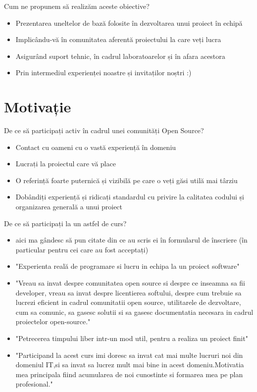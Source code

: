 \documentclass{beamer}
\begin{document}
\begin{frame}{Cum ne propunem să realizăm aceste obiective?}
  \begin{itemize} %
  \pause
  \item Prezentarea uneltelor de bază folosite în dezvoltarea unui proiect în echipă
  \pause
  \item Implicându-vă în comunitatea aferentă proiectului la care veți lucra 
  \pause
  \item Asigurând suport tehnic, în cadrul laboratoarelor și în afara acestora
  \pause
  \item Prin intermediul experienței noastre și invitaților noștri :)
  \end{itemize}
\end{frame}

\section{Motivație}

\begin{frame}{De ce să participați activ în cadrul unei comunități Open Source?}
  \begin{itemize} %
  \pause
  \item Contact cu oameni cu o vastă experiență în domeniu 
  \pause
  \item Lucrați la proiectul care vă place 
  \pause
  \item O referință foarte puternică și vizibilă pe care o veți găsi utilă mai târziu
  \pause
  \item Dobândiți experiență și ridicați standardul cu privire la calitatea codului și organizarea generală a unui proiect
  \end{itemize}
\end{frame}

\begin{frame}{De ce să participați la un astfel de curs?}
  \begin{itemize} %
  \item aici ma gândesc să pun citate din ce au scris ei în formularul de înscriere (în particular pentru cei care au fost acceptați) 
  \pause
  \item "Experienta reală de programare si lucru in echipa la un proiect software" 
  \pause
  \item "Vreau sa invat despre comunitatea open source si despre ce inseamna sa fii developer, vreau sa invat despre licentierea softului, despre cum trebuie sa lucrezi eficient in cadrul comunitatii open source, utilitarele de dezvoltare, cum sa comunic, sa gasesc solutii si sa gasesc documentatia necesara in cadrul proiectelor open-source."
  \pause
  \item "Petrecerea timpului liber intr-un mod util, pentru a realiza un proiect finit"
  \pause
  \item "Participand la acest curs imi doresc sa invat cat mai multe lucruri noi din domeniul IT,si sa invat sa lucrez mult mai bine in acest domeniu.Motivatia mea principala fiind acumularea de noi cunostinte si formarea mea pe plan profesional."
   \end{itemize}
\end{frame}
\end{document}
